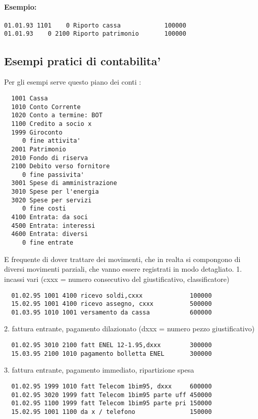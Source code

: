 \documentclass[12pt]{report}
\begin{document}
\begin{appendix}
\paragraph{Esempio:}

\begin{verbatim}
01.01.93 1101    0 Riporto cassa            100000
01.01.93    0 2100 Riporto patrimonio       100000
\end{verbatim}

\subsection{Esempi pratici di contabilita'}

Per gli esempi serve questo piano dei conti :

\begin{verbatim}
  1001 Cassa
  1010 Conto Corrente
  1020 Conto a termine: BOT
  1100 Credito a socio x
  1999 Giroconto
     0 fine attivita'
  2001 Patrimonio
  2010 Fondo di riserva
  2100 Debito verso fornitore
     0 fine passivita'
  3001 Spese di amministrazione
  3010 Spese per l'energia
  3020 Spese per servizi
     0 fine costi
  4100 Entrata: da soci
  4500 Entrata: interessi
  4600 Entrata: diversi
     0 fine entrate
\end{verbatim}

E frequente di dover trattare dei movimenti, che in realta si compongono di
diversi movimenti parziali, che vanno essere registrati in modo detagliato.
1. incassi vari (cxxx = numero consecutivo del giustificativo, classificatore)
\begin{verbatim}
  01.02.95 1001 4100 ricevo soldi,cxxx             100000
  15.02.95 1001 4100 ricevo assegno, cxxx          500000
  01.03.95 1010 1001 versamento da cassa           600000
\end{verbatim}

2. fattura entrante, pagamento dilazionato (dxxx = numero pezzo giustificativo)
\begin{verbatim}
  01.02.95 3010 2100 fatt ENEL 12-1.95,dxxx        300000
  15.03.95 2100 1010 pagamento bolletta ENEL       300000
\end{verbatim}

3. fattura entrante, pagamento immediato, ripartizione spesa
\begin{verbatim}
  01.02.95 1999 1010 fatt Telecom 1bim95, dxxx     600000
  01.02.95 3020 1999 fatt Telecom 1bim95 parte uff 450000
  01.02.95 1100 1999 fatt Telecom 1bim95 parte pri 150000
  15.02.95 1001 1100 da x / telefono               150000
\end{verbatim}


\end{appendix}
\end{document}
